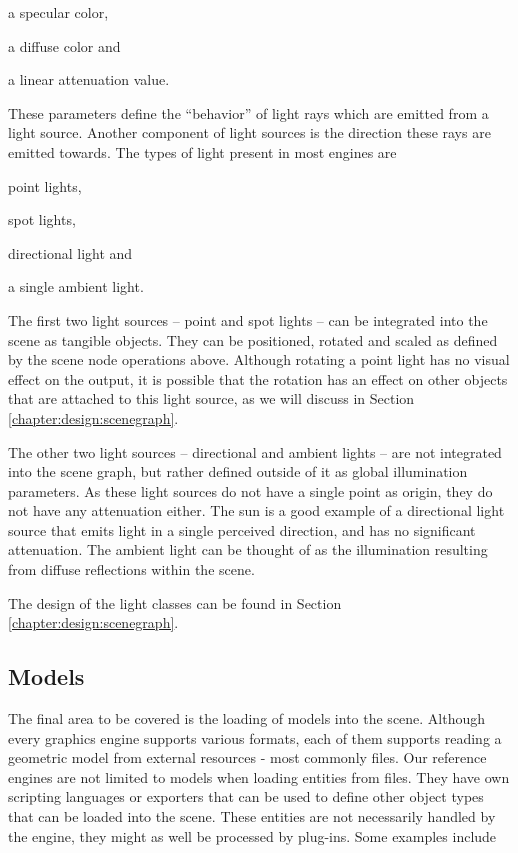 		\begin{smalllist}
			\item a specular color,
			\item a diffuse color and
			\item a linear attenuation value.
		\end{smalllist}

		These parameters define the ``behavior'' of light rays which are emitted from a light source. Another component of light sources is the direction these rays are emitted towards. The types of light present in most engines are

		\begin{smalllist}
			\item point lights,
			\item spot lights,
			\item directional light and
			\item a single ambient light.
		\end{smalllist}

		The first two light sources -- point and spot lights -- can be integrated into the scene as tangible objects. They can be positioned, rotated and scaled as defined by the scene node operations above. Although rotating a point light has no visual effect on the output, it is possible that the rotation has an effect on other objects that are attached to this light source, as we will discuss in Section \ref{chapter:design:scenegraph}.

		The other two light sources -- directional and ambient lights -- are not integrated into the scene graph, but rather defined outside of it as global illumination parameters. As these light sources do not have a single point as origin, they do not have any attenuation either. The sun is a good example of a directional light source that emits light in a single perceived direction, and has no significant attenuation. The ambient light can be thought of as the illumination resulting from diffuse reflections within the scene.

		The design of the light classes can be found in Section \ref{chapter:design:scenegraph}.

	\subsection{Models}

		The final area to be covered is the loading of models into the scene. Although every graphics engine supports various formats, each of them supports reading a geometric model from external resources - most commonly files. Our reference engines are not limited to models when loading entities from files. They have own scripting languages or exporters that can be used to define other object types that can be loaded into the scene. These entities are not necessarily handled by the engine, they might as well be processed by plug-ins. Some examples include
		
